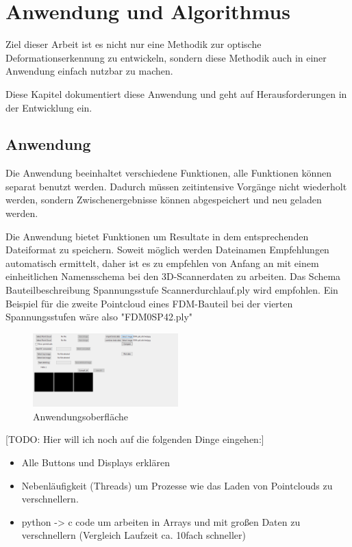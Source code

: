 
\chapter{Anwendung und Algorithmus}

Ziel dieser Arbeit ist es nicht nur eine Methodik zur optische 
Deformationserkennung zu entwickeln, sondern diese Methodik auch in einer 
Anwendung einfach nutzbar zu machen. 

Diese Kapitel dokumentiert diese Anwendung und geht auf Herausforderungen 
in der Entwicklung ein.

\section{Anwendung}

Die Anwendung beeinhaltet verschiedene Funktionen, alle Funktionen 
können separat benutzt werden. Dadurch müssen zeitintensive Vorgänge nicht 
wiederholt werden, sondern Zwischenergebnisse können abgespeichert und 
neu geladen werden. 

Die Anwendung bietet Funktionen um Resultate in dem entsprechenden Dateiformat zu 
speichern. Soweit möglich werden Dateinamen Empfehlungen automatisch ermittelt, 
daher ist es zu empfehlen von Anfang an mit einem einheitlichen Namensschema bei
den 3D-Scannerdaten zu arbeiten. 
Das Schema Bauteilbeschreibung \textunderscore Spannungsstufe 
\textunderscore Scannerdurchlauf.ply
wird empfohlen. Ein Beispiel für die zweite Pointcloud eines FDM-Bauteil bei der
vierten Spannungsstufen wäre also "FDM0\textunderscore SP4\textunderscore 2.ply"


\begin{figure}[H]
    \centering
    \includegraphics[width=0.5\textwidth]{images/software_screenshot.png}
    \caption{Anwendungsoberfläche}
    \label{fig:software_screenshot}
\end{figure}

[TODO: Hier will ich noch auf die folgenden Dinge eingehen:]

\begin{itemize}
    \item Alle Buttons und Displays erklären
    \item Nebenläufigkeit (Threads) um Prozesse wie das Laden von Pointclouds 
    zu verschnellern.
    \item  python -> c code um arbeiten in Arrays und mit großen Daten zu verschnellern
    (Vergleich Laufzeit ca. 10fach schneller)
\end{itemize}


